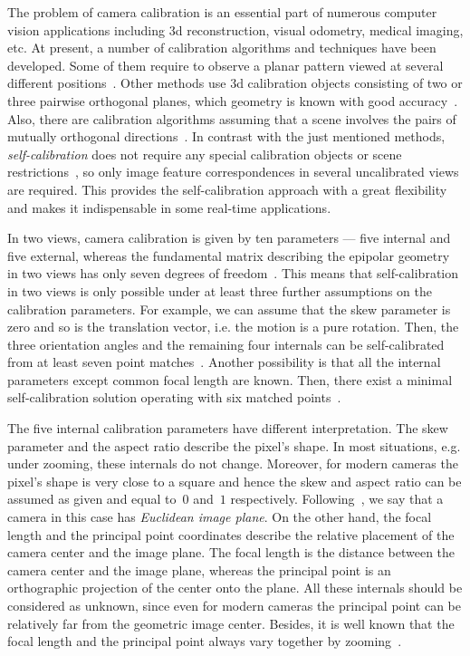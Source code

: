 \documentclass[reqno]{amsart}
\theoremstyle{plain}
\begin{document}
The problem of camera calibration is an essential part of numerous computer vision applications including 3d reconstruction, visual odometry, medical imaging, etc. At present, a number of calibration algorithms and techniques have been developed. Some of them require to observe a planar pattern viewed at several different positions~\cite{Faugeras93,Heikkila,Zhang}. Other methods use 3d calibration objects consisting of two or three pairwise orthogonal planes, which geometry is known with good accuracy~\cite{Tsai}. Also, there are calibration algorithms assuming that a scene involves the pairs of mutually orthogonal directions~\cite{CP90,LZ99}. In contrast with the just mentioned methods, \emph{self-calibration} does not require any special calibration objects or scene restrictions~\cite{Hartley92,MF,QT,Triggs}, so only image feature correspondences in several uncalibrated views are required. This provides the self-calibration approach with a great flexibility and makes it indispensable in some real-time applications.

In two views, camera calibration is given by ten parameters --- five internal and five external, whereas the fundamental matrix describing the epipolar geometry in two views has only seven degrees of freedom~\cite{Hartley92}. This means that self-calibration in two views is only possible under at least three further assumptions on the calibration parameters. For example, we can assume that the skew parameter is zero and so is the translation vector, i.e. the motion is a pure rotation. Then, the three orientation angles and the remaining four internals can be self-calibrated from at least seven point matches~\cite{Hartley}. Another possibility is that all the internal parameters except common focal length are known. Then, there exist a minimal self-calibration solution operating with six matched points~\cite{SNKS,BJA,KBP,Li}.

The five internal calibration parameters have different interpretation. The skew parameter and the aspect ratio describe the pixel's shape. In most situations, e.g. under zooming, these internals do not change. Moreover, for modern cameras the pixel's shape is very close to a square and hence the skew and aspect ratio can be assumed as given and equal to~$0$ and~$1$ respectively. Following~\cite{HA}, we say that a camera in this case has \emph{Euclidean image plane}. On the other hand, the focal length and the principal point coordinates describe the relative placement of the camera center and the image plane. The focal length is the distance between the camera center and the image plane, whereas the principal point is an orthographic projection of the center onto the plane. All these internals should be considered as unknown, since even for modern cameras the principal point can be relatively far from the geometric image center. Besides, it is well known that the focal length and the principal point always vary together by zooming~\cite{Sturm}.
\end{document}
